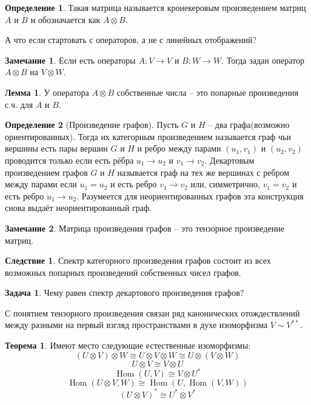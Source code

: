 \documentclass[10pt,a4paper,oneside]{book}
\theoremstyle{definition}
\newtheorem*{rem}{Замечание}
\newtheorem{zad}{Задача}
\newtheorem*{defn}{Определение}
\newtheorem{thm}{Теорема}
\newtheorem{lem}{Лемма}
\newtheorem{cor}{Следствие}
\newcommand{\Hom}{\operatorname{Hom}}
\def\thrm{\begin{thm}}
\def\ethrm{\end{thm}}
\def\dfn{\begin{defn}}
\def\edfn{\end{defn}}
\def\lm{\begin{lem}}
\def\elm{\end{lem}}
\def\zd{\begin{zad}}
\def\ezd{\end{zad}}
\def\crl{\begin{cor}}
\def\ecrl{\end{cor}}
\def\rm{\begin{rem}}
\def\erm{\end{rem}}
\begin{document}
\dfn Такая матрица называется кронекеровым произведением матриц $A$ и $B$ и обозначается как $A\otimes B$.
\edfn

А что если стартовать с операторов, а не с линейных отображений?

\rm Если есть операторы $A\colon V \to V$ и $B \colon W \to W$. Тогда задан оператор $A\otimes B$ на $V\otimes W$. \erm

\lm У оператора $A\otimes B$ собственные числа -- это попарные произведения с.ч. для $A$ и $B$. 
\elm


 

\dfn[Произведение графов] Пусть $G$ и $H$ -- два графа(возможно ориентированных). Тогда их категорным произведением называется граф чьи вершины есть пары вершин $G$ и $H$ и ребро между парами $(u_1,v_1)$ и $(u_2,v_2)$ проводится только если есть рёбра $u_1 \to u_2$ и $v_1 \to v_2$. Декартовым произведением графов $G$ и $H$ называется граф на тех же вершинах с ребром между парами если $u_1=u_2$ и есть ребро $v_1\to v_2$ или, симметрично, $v_1=v_2$ и есть ребро $u_1 \to u_2$. Разумеется для неориентированных графов эта конструкция снова выдаёт неориентированный граф.
\edfn

\rm Матрица произведения графов -- это тензорное произведение матриц.
\erm

\crl Спектр категорного произведения графов состоит из всех возможных попарных произведений собственных чисел графов.
\ecrl

\zd Чему равен спектр декартового произведения графов?
\ezd


С понятием тензорного произведения связан ряд канонических отождествлений между разными на первый взгляд пространствами в духе изоморфизма $V \sim V^{**}$.

\thrm Имеют место следующие естественные изоморфизмы: 
$$(U \otimes V) \otimes W \cong U \otimes V \otimes W \cong U \otimes (V \otimes W)$$
$$ U \otimes V \cong V \otimes U $$
$$ \Hom (U,V) \cong V \otimes U^*$$
$$ \Hom (U\otimes V,  W) \cong \Hom (U, \Hom (V,W))$$
$$(U \otimes V)^{*} \cong U^{*}\otimes V^{*}$$
\ethrm
\end{document}
